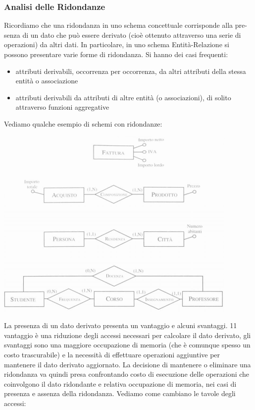 \documentclass[a4paper,12pt, oneside]{book}
\begin{document}
\subsubsection{Analisi delle Ridondanze}
Ricordiamo che una ridondanza in uno schema concettuale corrisponde alla pre-
senza di un dato che può essere derivato (cioè ottenuto attraverso una serie di operazioni) da altri dati. In particolare, in uno schema Entità-Relazione si possono
presentare varie forme di ridondanza.
Si hanno dei casi frequenti:
\begin{itemize}
\item attributi derivabili, occorrenza per occorrenza, da altri attributi della stessa entità o associazione
\item attributi derivabili da attributi di altre entità (o associazioni), di solito attraverso
funzioni aggregative
\end{itemize}
Vediamo qualche esempio di schemi con ridondanze:
\begin{center}
\includegraphics[scale=1]{img/rid.png}
\end{center}
\newpage
La presenza di un dato derivato presenta un vantaggio e alcuni svantaggi. 11 vantaggio
è una riduzione degli accessi necessari per calcolare il dato derivato,
gli svantaggi sono una maggiore occupazione di memoria (che è comunque spesso un
costo trascurabile) e la necessità di effettuare operazioni aggiuntive per mantenere
il dato derivato aggiornato. La decisione di mantenere o eliminare una ridondanza
va quindi presa confrontando costo di esecuzione delle operazioni che coinvolgono
il dato ridondante e relativa occupazione di memoria, nei casi di presenza e
assenza della ridondanza. Vediamo come cambiano le tavole degli accessi:
\end{document}
